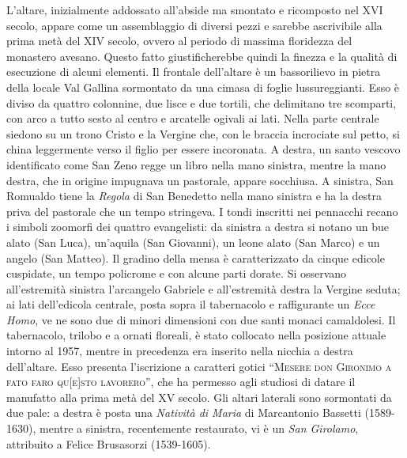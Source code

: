 \documentclass[10pt,b6paper,usenames,twoside]{article}
\begin{document}
\vspace*{-1mm}L’altare, inizialmente addossato all’abside ma smontato e ricomposto nel XVI secolo, appare come un assemblaggio di diversi pezzi e sarebbe ascrivibile alla prima metà del XIV secolo, ovvero al periodo di massima floridezza del monastero avesano. Questo fatto giustificherebbe quindi la finezza e la qualità di esecuzione di alcuni elementi. Il frontale dell’altare è un bassorilievo in pietra della locale Val Gallina sormontato da una cimasa di foglie lussureggianti. Esso è diviso da quattro colonnine, due lisce e due tortili, che delimitano tre scomparti, con arco a tutto sesto al centro e arcatelle ogivali ai lati.  Nella parte centrale siedono su un trono Cristo e la Vergine che, con le braccia incrociate sul petto, si china leggermente verso il figlio per essere incoronata. A destra, un santo vescovo identificato come San Zeno regge un libro nella mano sinistra, mentre la mano destra, che in origine impugnava un pastorale, appare socchiusa. A sinistra, San Romualdo tiene la \textit{Regola} di San Benedetto nella mano sinistra e ha la destra priva del pastorale che un tempo stringeva. I tondi inscritti nei pennacchi recano i simboli zoomorfi dei quattro evangelisti: da sinistra a destra si notano un bue alato (San Luca), un’aquila (San Giovanni), un leone alato (San Marco) e un angelo (San Matteo). Il gradino della mensa è caratterizzato da cinque edicole cuspidate, un tempo policrome e con alcune parti dorate. Si osservano all’estremità sinistra l’arcangelo Gabriele e all’estremità destra la Vergine seduta; ai lati dell’edicola centrale, posta sopra il tabernacolo e raffigurante un \textit{Ecce Homo}, ve ne sono due di minori dimensioni con due santi monaci camaldolesi. Il tabernacolo, trilobo e a ornati floreali, è stato collocato nella posizione attuale intorno al 1957, mentre in precedenza era inserito nella nicchia a destra dell’altare. Esso presenta l’iscrizione a caratteri gotici “\textsc{Mesere don Gironimo a fato faro qu[e]sto lavorero}”, che ha permesso agli studiosi di datare il manufatto alla prima metà del XV secolo. Gli altari laterali sono sormontati da due pale: a destra è posta una \textit{Natività di Maria} di Marcantonio Bassetti (1589-1630), mentre a sinistra, recentemente restaurato, vi è un \textit{San Girolamo}, attribuito a Felice Brusasorzi (1539-1605). 
\clearpage
\end{document}
